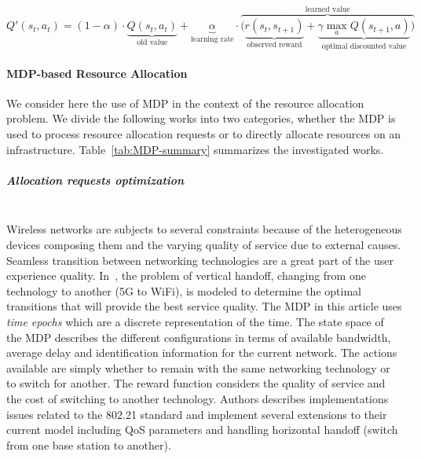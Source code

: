 \begin{equation}\label{eq:updatingq}
Q'(s_{t},a_{t}) = (1-\alpha) \cdot \underbrace{Q(s_{t},a_{t})}_{\text{old value}} + \underbrace{\alpha}_{\text{learning rate}} \cdot  \overbrace{\bigg( \underbrace{r(s_t,s_{t+1})}_{\text{observed reward}} + \underbrace{\gamma \max_{a}Q(s_{t+1}, a)}_{\text{optimal discounted value}} \bigg) }^{\text{learned value}}
\end{equation}



\paragraph{MDP-based Resource Allocation}
\textbf{\newline}
We consider here the use of MDP in the context of the resource allocation problem.
We divide the following works into two categories, whether the MDP is used to process resource allocation requests or to directly allocate resources on an infrastructure.
Table~\ref{tab:MDP-summary} summarizes the investigated works.

\subparagraph{Allocation requests optimization}
\textbf{\\}
Wireless networks are subjects to several constraints because of the heterogeneous devices composing them and the varying quality of service due to external causes. Seamless transition between networking technologies are a great part of the user experience quality. In~\cite{navarro2008}, the problem of vertical handoff, \ie changing from one technology to another (\eg 5G to WiFi), is modeled to determine the optimal transitions that will provide the best service quality. 
The MDP in this article uses \textit{time epochs} which are a discrete representation of the time.
The state space of the MDP describes the different configurations in terms of available bandwidth, average delay and identification information for the current network.
The actions available are simply whether to remain with the same networking technology or to switch for another. The reward function considers the quality of service and the cost of switching to another technology.
Authors describes implementations issues related to the 802.21 standard and implement several extensions to their current model including QoS parameters and handling horizontal handoff (\ie switch from one base station to another).

